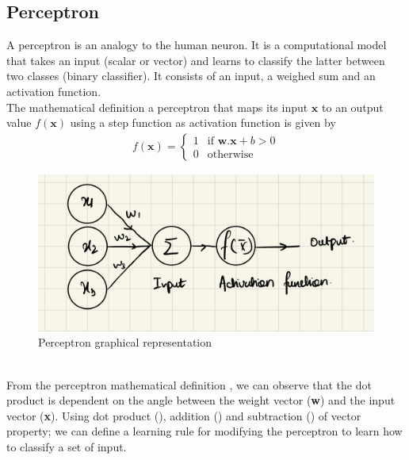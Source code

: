 \subsection{Perceptron}
A perceptron is an analogy to the human neuron. It is a computational model that takes an input (scalar or vector) and learns to classify the latter between two classes (binary classifier). It consists of an input, a weighed sum and an activation function. \\ The mathematical definition a perceptron that maps its input $\textbf{x}$ to an output value $f(\textbf{x})$ using a step function as activation function is given by
\begin{align}
  f(\textbf{x}) =
  \begin{cases}
    1 & \text{if } \textbf{w.x} + b > 0 \\
    0 & \text{otherwise}
    \label{eq:perceptron_def}
  \end{cases}
\end{align}
\begin{figure}[h]
  \centering
  \includegraphics[scale=0.15]{CHAPTER_2/c2_fig_perceptron.jpeg}
  \caption{Perceptron graphical representation}
  \label{fig:perceptron}
\end{figure}\\
From the perceptron mathematical definition , we can observe that the dot product is dependent on the angle between the weight vector (\textbf{w}) and the input vector (\textbf{x}). Using dot product (), addition () and subtraction () of vector property; we can define a learning rule for modifying the perceptron to learn how to classify a set of input.
